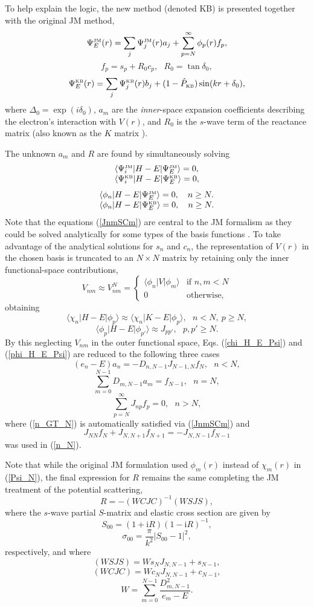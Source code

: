 \documentclass[aip
, pra
, showpacs
, aps
, twocolumn
, groupedaddress
, floatfix
]{revtex4}
\newcommand{\beq}{\begin{equation}}
\newcommand{\eeq}{\end{equation}}
\newcommand{\barr}{\begin{array}}
\newcommand{\earr}{\end{array}}
\newcommand{\JM}{\mbox{\tiny{JM}}}
\newcommand{\KB}{\mbox{\tiny{KB}}}
\begin{document}
To help explain the logic, the new method (denoted KB) is presented together with the original JM method,
\beq 
\Psi_E^{\JM}(r) =\sum_j \Psi_j^{\JM}(r)a_j  + \sum_{p=N}^{\infty} \phi_p(r) f_p, 
\eeq
\beq 
f_p = s_p + R_0 c_p, \ \ \ R_0 = \tan \delta_0,
\eeq
\beq
\Psi_E^{\KB}(r) =\sum_j \Psi_j^{\KB}(r) b_j  + (1-\hat{P}_{\KB}) \sin(kr + \delta_0),
\eeq
where $\Delta_0 = \exp(i\delta_0)$, 
$a_m$ are the {\em inner}-space expansion coefficients describing  the electron's interaction with  $V(r)$, and
$R_0$ is the $s$-wave term of the reactance matrix (also known as the $K$ matrix \cite{Taylor72}).


The unknown $a_m$ and $R$ are found by simultaneously solving
\beq \barr{l}
\langle\Psi_i^{\JM}|H-E|\Psi_E^{\JM}\rangle= 0, \\
\langle\Psi_i^{\KB}|H-E|\Psi_E^{\KB}\rangle=0 , 
\earr \eeq
\beq \barr{l}
\langle\phi_n|H-E|\Psi_E^{\JM}\rangle=0 , \ \ \ n \geq N.\\
\langle\phi_n|H-E|\Psi_E^{\KB}\rangle=0 , \ \ \ n \geq N.
\earr \eeq
Note that the equations (\ref{JnmSCm}) are central to the JM formalism as they could be solved analytically for some types of the basis functions \cite{YAA01p042703}. To take advantage of the analytical solutions for $s_n$  and  $c_n$, the representation of $V(r)$  in the chosen basis is truncated to an $N\times N$  matrix by retaining only the inner functional-space contributions,
\beq
V_{nm} \approx V_{nm}^N = \left\{
\begin{array}{ll}
\langle\phi_n|V|\phi_m\rangle & \mbox{if $n,m < N$} \\
0 & \mbox{otherwise,}   \end{array}  \right.
\label{V_N}
\eeq
obtaining
\beq
\langle\chi_n|H-E|\phi_p\rangle \approx \langle\chi_n|K-E|\phi_p\rangle, \ \ \ n<N, \ p\geq N,
\label{chi_H_E_phi_p}
\eeq
\beq
\langle\phi_p|H-E|\phi_{p'}\rangle \approx J_{pp'}, \ \ \ p,p'\geq N.
\label{phi_H_E_phi_p}
\eeq
 By this neglecting $V_{nm}$ in the outer functional space, Eqs. (\ref{chi_H_E_Psi}) and (\ref{phi_H_E_Psi}) are reduced to the following three cases
\beq
(e_n-E)a_n=-D_{n,N-1}J_{N-1,N}f_N, \ \ \ n<N,
\label{n_N_1}
\eeq
\beq
\sum_{m=0}^{N-1}  D_{m,N-1}a_m=f_{N-1}, \ \ \ n=N,
\label{n_N}
\eeq
\beq
\sum_{p=N}^{\infty}  J_{np}f_p=0, \ \ \ n>N,
\label{n_GT_N}
\eeq
where (\ref{n_GT_N}) is automatically satisfied via (\ref{JnmSCm}) and
\beq
J_{NN}f_N+J_{N,N+1}f_{N+1}=-J_{N,N-1}f_{N-1}
\eeq
was used in (\ref{n_N}).

Note that while the original JM formulation used $\phi_m(r)$ instead of $\chi_m(r)$ in (\ref{Psi_N}), the final expression for $R$ remains the same completing the JM treatment of the potential scattering,
\beq
R= - (WCJC)^{-1} (WSJS),
\label{R}
\eeq
where the $s$-wave partial $S$-matrix and elastic cross section are given by
\beq
S_{00}=(1+\mbox{i}R)(1-\mbox{i}R)^{-1},
\eeq
\beq
\sigma_{00}=\frac{\pi}{k^2} |S_{00}-1|^2,
\eeq
respectively, and where
\beq
(WSJS) = W s_N J_{N,N-1} + s_{N-1},
\eeq
\beq
(WCJC) = W c_N J_{N,N-1} + c_{N-1},
\eeq
\beq
W= \sum_{m=0}^{N-1} \frac{D_{m,N-1}^2}{e_m-E}.
\label{g}
\eeq
\end{document}
